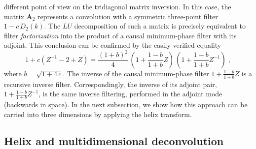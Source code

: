 different point of view on the tridiagonal matrix inversion. In this
case, the matrix $\mathbf{A}_2$ represents a convolution with a
symmetric three-point filter $1-c\,D_2(k)$. The $LU$
decomposition of such a matrix is precisely equivalent to filter
\emph{factorization} into the product of a causal minimum-phase filter
with its adjoint. This conclusion can be confirmed by the easily
verified equality
\begin{equation}\label{eqn:d2d1}
  1 + c (Z^{-1} - 2 + Z) = \frac{(1+b)^2}{4}\, \left(1 + \frac{1-b}{1+b} Z\right)
  \,\left(1 + \frac{1-b}{1+b} Z^{-1}\right)\;,
\end{equation}
where $b = \sqrt{1+ 4\,c}$. The inverse of the causal minimum-phase
filter $1 + \frac{1-b}{1+b} Z$ is a recursive inverse filter.
Correspondingly, the inverse of its adjoint pair, $1 + \frac{1-b}{1+b}
Z^{-1}$, is the same inverse filtering, performed in the adjoint mode
(backwards in space).  In the next subsection, we show how this
approach can be carried into three dimensions by applying the helix
transform.

\subsection{Helix and multidimensional deconvolution}

